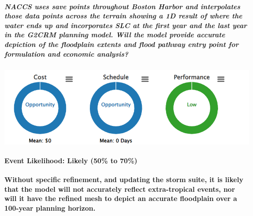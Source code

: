 \documentclass[
]{article}
\begin{document}
\hypertarget{naccs-uses-save-points-throughout-boston-harbor-and-interpolates-those-data-points-across-the-terrain-showing-a-1d-result-of-where-the-water-ends-up-and-incorporates-slc-at-the-first-year-and-the-last-year-in-the-g2crm-planning-model.-will-the-model-provide-accurate-depiction-of-the-floodplain-extents-and-flood-pathway-entry-point-for-formulation-and-economic-analysis}{%
\subparagraph{NACCS uses save points throughout Boston Harbor and
interpolates those data points across the terrain showing a 1D result of
where the water ends up and incorporates SLC at the first year and the
last year in the G2CRM planning model. Will the model provide accurate
depiction of the floodplain extents and flood pathway entry point for
formulation and economic
analysis?}\label{naccs-uses-save-points-throughout-boston-harbor-and-interpolates-those-data-points-across-the-terrain-showing-a-1d-result-of-where-the-water-ends-up-and-incorporates-slc-at-the-first-year-and-the-last-year-in-the-g2crm-planning-model.-will-the-model-provide-accurate-depiction-of-the-floodplain-extents-and-flood-pathway-entry-point-for-formulation-and-economic-analysis}}

\begin{center}\includegraphics[width=12.1in]{images/montecarlo} \end{center}

\hypertarget{event-likelihood-likely-50-to-70}{%
\paragraph{\texorpdfstring{\textbf{Event Likelihood:} Likely (50\% to
70\%)}{Event Likelihood: Likely (50\% to 70\%)}}\label{event-likelihood-likely-50-to-70}}

\hypertarget{without-specific-refinement-and-updating-the-storm-suite-it-is-likely-that-the-model-will-not-accurately-reflect-extra-tropical-events-nor-will-it-have-the-refined-mesh-to-depict-an-accurate-floodplain-over-a-100-year-planning-horizon.}{%
\paragraph{Without specific refinement, and updating the storm suite, it
is likely that the model will not accurately reflect extra-tropical
events, nor will it have the refined mesh to depict an accurate
floodplain over a 100-year planning
horizon.}\label{without-specific-refinement-and-updating-the-storm-suite-it-is-likely-that-the-model-will-not-accurately-reflect-extra-tropical-events-nor-will-it-have-the-refined-mesh-to-depict-an-accurate-floodplain-over-a-100-year-planning-horizon.}}
\end{document}
